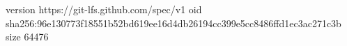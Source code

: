 version https://git-lfs.github.com/spec/v1
oid sha256:96e130773f18551b52bd619ee16d4db26194cc399e5cc8486ffd1ec3ac271c3b
size 64476
